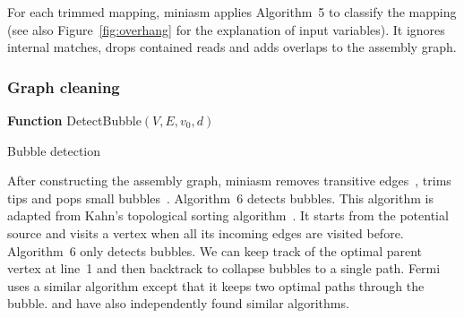 \documentclass{bioinfo}
\begin{document}
\begin{methods}
For each trimmed mapping, miniasm applies Algorithm~5 to classify the mapping
(see also Figure~\ref{fig:overhang} for the explanation of input variables).
It ignores internal matches, drops contained reads and adds overlaps to the
assembly graph.


\subsubsection{Graph cleaning}

\begin{algorithm}[tb]
\DontPrintSemicolon
\footnotesize
{}
\BlankLine
\textbf{Function} {\sc DetectBubble}$(V,E,v_0,d)$
\caption{Bubble detection}
\end{algorithm}

After constructing the assembly graph, miniasm removes transitive
edges~\citep{Myers:2005bh}, trims tips and pops small
bubbles~\citep{Zerbino:2008uq}. Algorithm~6 detects bubbles. This algorithm is
adapted from Kahn's topological sorting algorithm~\citep{Kahn62aa}. It starts
from the potential source and visits a vertex when all its incoming edges are
visited before. Algorithm~6 only detects bubbles. We can keep track of the
optimal parent vertex at line~1 and then backtrack to collapse bubbles to a
single path. Fermi~\citep{Li:2012fk} uses a similar algorithm except that it
keeps two optimal paths through the bubble.  \citet{DBLP:conf/wabi/OnoderaSS13}
and \citet{TCS15} have also independently found similar algorithms.


\end{methods}
\end{document}
